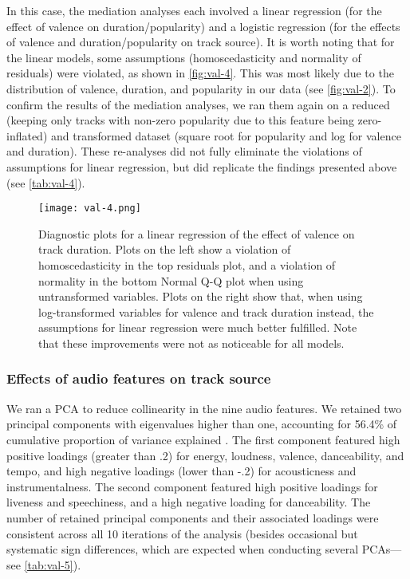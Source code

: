 

In this case, the mediation analyses each involved a linear regression (for the effect of valence on duration/popularity) and a logistic regression (for the effects of valence and duration/popularity on track source). It is worth noting that for the linear models, some assumptions (homoscedasticity and normality of residuals) were violated, as shown in \autoref{fig:val-4}. This was most likely due to the distribution of valence, duration, and popularity in our data (see \autoref{fig:val-2}). To confirm the results of the mediation analyses, we ran them again on a reduced (keeping only tracks with non-zero popularity due to this feature being zero-inflated) and transformed dataset (square root for popularity and log for valence and duration). These re-analyses did not fully eliminate the violations of assumptions for linear regression, but did replicate the findings presented above (see \autoref{tab:val-4}).

\begin{figure}[t!]
\texttt{[image: val-4.png]}
\centering
\caption{Diagnostic plots for a linear regression of the effect of valence on track duration. Plots on the left show a violation of homoscedasticity in the top residuals plot, and a violation of normality in the bottom Normal Q-Q plot when using untransformed variables. Plots on the right show that, when using log-transformed variables for valence and track duration instead, the assumptions for linear regression were much better fulfilled. Note that these improvements were not as noticeable for all models.}
\label{fig:val-4}
\end{figure}



\subsubsection{Effects of audio features on track source}
\label{se:val-results-3}

We ran a PCA to reduce collinearity in the nine audio features. We retained two principal components with eigenvalues higher than one, accounting for 56.4\% of cumulative proportion of variance explained \parencite[see supplementary materials discussed earlier in][for the values for each set of tracks]{defleurian2021a}. The first component featured high positive loadings (greater than .2) for energy, loudness, valence, danceability, and tempo, and high negative loadings (lower than -.2) for acousticness and instrumentalness. The second component featured high positive loadings for liveness and speechiness, and a high negative loading for danceability. The number of retained principal components and their associated loadings were consistent across all 10 iterations of the analysis (besides occasional but systematic sign differences, which are expected when conducting several PCAs---see \autoref{tab:val-5}).

